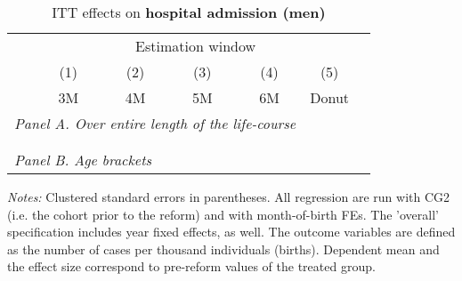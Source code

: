  \vspace*{\fill}
 \begin{table}[H] \centering 
 	\begin{threeparttable} \centering \caption{ITT effects on \textbf{hospital admission (men)}}\label{tab: DD_hopsital2_male} {\def\sym#1{\ifmmode^{#1}\else\(^{#1}\)\fi} 
 		\begin{tabular}{l*{6}{c}}
 			\toprule 
 			& \multicolumn{5}{c}{Estimation window} \\ 
 			\cmidrule(lr){2-6}
 			&\multicolumn{1}{c}{(1)}&\multicolumn{1}{c}{(2)}&\multicolumn{1}{c}{(3)}&\multicolumn{1}{c}{(4)}&\multicolumn{1}{c}{(5)}\\
 			&\multicolumn{1}{c}{3M}&\multicolumn{1}{c}{4M}&\multicolumn{1}{c}{5M}&\multicolumn{1}{c}{6M}&\multicolumn{1}{c}{Donut}\\
 				\midrule
 				\multicolumn{5}{l}{\emph{Panel A. Over entire length of the life-course}} \\
 				 \\ \\
 				\multicolumn{5}{l}{\emph{Panel B. Age brackets}} \\
 				    
 				\bottomrule 
 		\end{tabular}}
 		\begin{tablenotes} 
 			\item \scriptsize \emph{Notes:} Clustered standard errors in parentheses. All regression are run with CG2 (i.e. the cohort prior to the reform) and with month-of-birth FEs. The 'overall' specification includes year fixed effects, as well. The outcome variables are defined as the number of cases per thousand individuals (births). Dependent mean and the effect size correspond to pre-reform values of the treated group.
 		\end{tablenotes} 
 	\end{threeparttable} 
 \end{table} 
\vspace*{\fill}\clearpage 